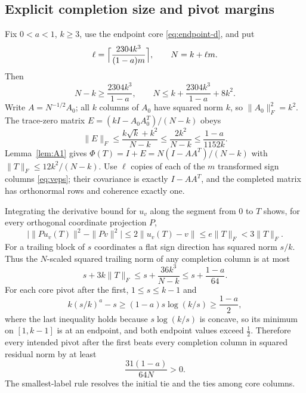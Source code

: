\documentclass[11pt,a4paper]{article}
\theoremstyle{definition}
\numberwithin{equation}{section}
\begin{document}
\subsection{Explicit completion size and pivot margins}
Fix $0<a<1$, $k\ge3$, use the endpoint core \eqref{eq:endpoint-d}, and put
\begin{equation}\label{eq:A6}
 \ell=\Bigl\lceil\frac{2304k^3}{(1-a)m}\Bigr\rceil,\qquad N=k+\ell m.
\end{equation}
Then
\begin{equation}\label{eq:A7}
 N-k\ge\frac{2304k^3}{1-a},\qquad N\le k+\frac{2304k^3}{1-a}+8k^2.
\end{equation}
Write $A=N^{-1/2}A_0$; all $k$ columns of $A_0$ have squared norm $k$, so $\|A_0\|_F^2=k^2$. The trace-zero matrix
$E=(kI-A_0A_0^T)/(N-k)$ obeys
\begin{equation}\label{eq:A8}
 \|E\|_F\le\frac{k\sqrt k+k^2}{N-k}\le\frac{2k^2}{N-k}\le\frac{1-a}{1152k}.
\end{equation}
Lemma~\ref{lem:A1} gives $\Phi(T)=I+E=N(I-AA^T)/(N-k)$ with $\|T\|_F\le12k^2/(N-k)$. Use $\ell$ copies of each of the
$m$ transformed sign columns \eqref{eq:veps}; their covariance is exactly $I-AA^T$, and the completed matrix has
orthonormal rows and coherence exactly one.

Integrating the derivative bound for $u_v$ along the segment from $0$ to $T$ shows, for every orthogonal coordinate
projection $P$,
\begin{equation}\label{eq:A9}
 \bigl|\|Pu_v(T)\|^2-\|Pv\|^2\bigr|\le2\|u_v(T)-v\|\le e\|T\|_F<3\|T\|_F.
\end{equation}
For a trailing block of $s$ coordinates a flat sign direction has squared norm $s/k$. Thus the $N$-scaled squared
trailing norm of any completion column is at most
\begin{equation}\label{eq:A10}
 s+3k\|T\|_F\le s+\frac{36k^3}{N-k}\le s+\frac{1-a}{64}.
\end{equation}
For each core pivot after the first, $1\le s\le k-1$ and
\begin{equation}\label{eq:A11}
 k(s/k)^a-s\ge(1-a)s\log(k/s)\ge\frac{1-a}2,
\end{equation}
where the last inequality holds because $s\log(k/s)$ is concave, so its minimum on $[1,k-1]$ is at an endpoint, and
both endpoint values exceed $\tfrac12$. Therefore every intended pivot after the first beats every completion column
in squared residual norm by at least
\begin{equation}\label{eq:A12}
 \frac{31(1-a)}{64N}>0.
\end{equation}
The smallest-label rule resolves the initial tie and the ties among core columns.
\end{document}
